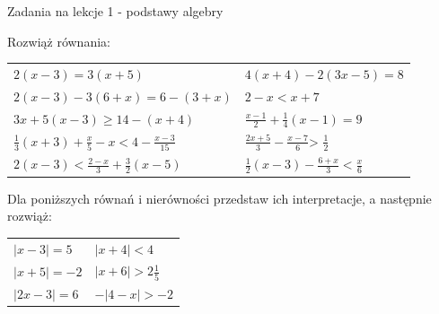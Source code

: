 \documentclass[12pt,a4paper]{article}
\theoremstyle{break}
\begin{document}
	
	\begin{center}
		\LARGE Zadania na lekcje 1 - podstawy algebry
	\end{center}
	\vspace{1.5cm}
	
	\begin{zad}
		Rozwiąż równania:
	\end{zad}
	\begin{enumerate}[a)] \begin{tabular}{p{7cm} p{7cm}} 
		\item $2(x-3)=3(x+5)$ & \vspace{0.25cm} 	\item$4(x+4)-2(3x-5)=8$ \\
		\item $2(x-3)-3(6+x)=6-(3+x)$ & \item $2-x<x+7$ \\
		\item $3x+5(x-3)\geq 14-(x+4)$ & \item $\frac{x-1}{2}+\frac{1}{4}(x-1)=9$ \\
		\item $\frac{1}{3}(x+3)+\frac{x}{5} - x < 4 - \frac{x-3}{15}$ & \item $\frac{2x+5}{3}-\frac{x-7}{6}$> $\frac{1}{2}$ \\
		\item $2(x-3)<\frac{2-x}{3}+\frac{3}{2}(x-5)$ & \item $\frac{1}{2}(x-3)-\frac{6+x}{3}<\frac{x}{6}$ \\
	\end{tabular} \end{enumerate}

	\begin{zad}
		Dla poniższych równań i nierówności przedstaw ich interpretacje, a następnie rozwiąż:
	\end{zad}
	\begin{enumerate}[a)] \begin{tabular}{p{7cm} p{7cm}} 
		\item $|x-3|=5$ & \vspace{0.25cm} 	\item$|x+4|<4$ \\
		\item $|x+5|=-2$ & \item $|x+6|>2\frac{1}{5}$ \\
		\item $|2x-3|=6$ & \item $-|4-x|>-2$ \\
	\end{tabular} \end{enumerate}
	
\end{document}
